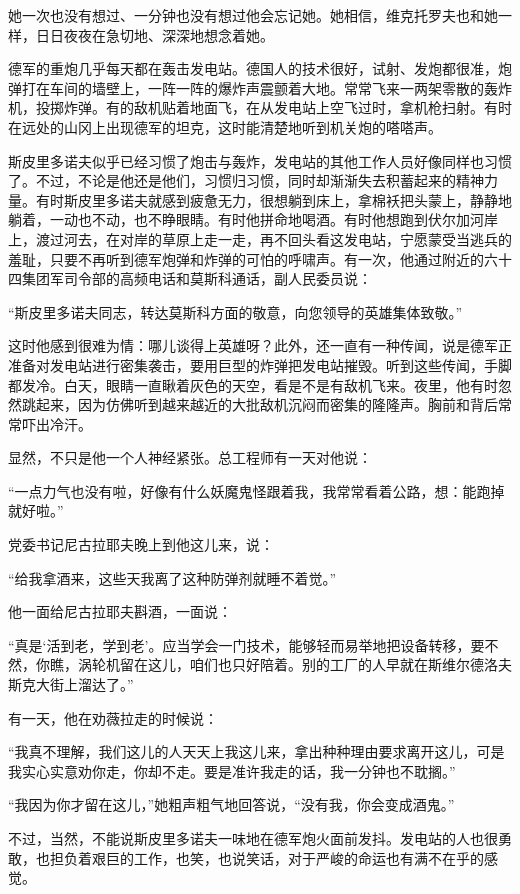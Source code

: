 她一次也没有想过、一分钟也没有想过他会忘记她。她相信，维克托罗夫也和她一样，日日夜夜在急切地、深深地想念着她。

德军的重炮几乎每天都在轰击发电站。德国人的技术很好，试射、发炮都很准，炮弹打在车间的墙壁上，一阵一阵的爆炸声震颤着大地。常常飞来一两架零散的轰炸机，投掷炸弹。有的敌机贴着地面飞，在从发电站上空飞过时，拿机枪扫射。有时在远处的山冈上出现德军的坦克，这时能清楚地听到机关炮的嗒嗒声。

斯皮里多诺夫似乎已经习惯了炮击与轰炸，发电站的其他工作人员好像同样也习惯了。不过，不论是他还是他们，习惯归习惯，同时却渐渐失去积蓄起来的精神力量。有时斯皮里多诺夫就感到疲惫无力，很想躺到床上，拿棉袄把头蒙上，静静地躺着，一动也不动，也不睁眼睛。有时他拼命地喝酒。有时他想跑到伏尔加河岸上，渡过河去，在对岸的草原上走一走，再不回头看这发电站，宁愿蒙受当逃兵的羞耻，只要不再听到德军炮弹和炸弹的可怕的呼啸声。有一次，他通过附近的六十四集团军司令部的高频电话和莫斯科通话，副人民委员说：

“斯皮里多诺夫同志，转达莫斯科方面的敬意，向您领导的英雄集体致敬。”

这时他感到很难为情：哪儿谈得上英雄呀？此外，还一直有一种传闻，说是德军正准备对发电站进行密集袭击，要用巨型的炸弹把发电站摧毁。听到这些传闻，手脚都发冷。白天，眼睛一直瞅着灰色的天空，看是不是有敌机飞来。夜里，他有时忽然跳起来，因为仿佛听到越来越近的大批敌机沉闷而密集的隆隆声。胸前和背后常常吓出冷汗。

显然，不只是他一个人神经紧张。总工程师有一天对他说：

“一点力气也没有啦，好像有什么妖魔鬼怪跟着我，我常常看着公路，想：能跑掉就好啦。”

党委书记尼古拉耶夫晚上到他这儿来，说：

“给我拿酒来，这些天我离了这种防弹剂就睡不着觉。”

他一面给尼古拉耶夫斟酒，一面说：

“真是‘活到老，学到老’。应当学会一门技术，能够轻而易举地把设备转移，要不然，你瞧，涡轮机留在这儿，咱们也只好陪着。别的工厂的人早就在斯维尔德洛夫斯克大街上溜达了。”

有一天，他在劝薇拉走的时候说：

“我真不理解，我们这儿的人天天上我这儿来，拿出种种理由要求离开这儿，可是我实心实意劝你走，你却不走。要是准许我走的话，我一分钟也不耽搁。”

“我因为你才留在这儿，”她粗声粗气地回答说，“没有我，你会变成酒鬼。”

不过，当然，不能说斯皮里多诺夫一味地在德军炮火面前发抖。发电站的人也很勇敢，也担负着艰巨的工作，也笑，也说笑话，对于严峻的命运也有满不在乎的感觉。

